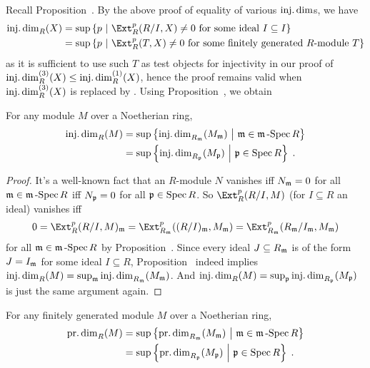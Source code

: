 \documentclass[a4paper,parskip=half,numbers=enddot, DIV=12]{scrreprt}
\begin{document}
Recall Proposition~. By the above proof of equality of various $\operatorname{inj.dim}$s, we have
\begin{align}\lbl{eq:idim}
	\begin{split}
		\idim_R(X)&=\sup\left\{p\st\Ext_R^p(R/I,X)\neq 0\text{ for some ideal }I\subseteq I\right\}\\
		&=\sup\left\{p\st\Ext_R^p(T,X)\neq 0\text{ for some finitely generated }R\text{-module }T\right\}
	\end{split}
\end{align}
as it is sufficient to use such $T$ as test objects for injectivity in our proof of $\operatorname{inj.dim}_R^{(3)}(X)\leq \operatorname{inj.dim}_R^{(1)}(X)$, hence the proof remains valid when $\operatorname{inj.dim}_R^{(3)}(X)$ is replaced by . Using Proposition~, we obtain
\begin{cor}
	For any module $M$ over a Noetherian ring,
	\begin{align*}
		\idim_R(M)&=\sup\left\{\idim_{R_\mm\vphantom{\pp}}(M_\mm)\st \mm\in\mSpec R\right\}\\
		&=\sup\left\{\idim_{R_\pp}(M_\pp)\st \pp\in\Spec R\right\}\;.
	\end{align*}
\end{cor}
\begin{proof}
	It's a well-known fact that an $R$-module $N$ vanishes iff $N_{\mathfrak{m}}=0$ for all $\mathfrak{m}\in\mathfrak{m}\operatorname{-Spec} R$ iff $N_{\mathfrak{p}}=0$ for all $\mathfrak{p}\in\operatorname{Spec} R$. So $\Ext_R^p(R/I,M)$ (for $I\subseteq R$ an ideal) vanishes iff
	\begin{align*}
		0=\Ext_R^p(R/I,M)_\mm=\Ext_{R_\mm}^p((R/I)_\mm,M_\mm)=\Ext_{R_\mm}^p(R_\mm/I_\mm,M_\mm)
	\end{align*}
	for all $\mathfrak{m}\in\mathfrak{m}\operatorname{-Spec} R$ by Proposition~. Since every ideal $J\subseteq R_{\mathfrak{m}}$ is of the form $J=I_{\mathfrak{m}}$ for some ideal $I\subseteq R$, Proposition~ indeed implies $\operatorname{inj.dim}_R(M)=\sup_{\mathfrak{m}}\operatorname{inj.dim}_{R_{\mathfrak{m}}}(M_{\mathfrak{m}})$. And $\operatorname{inj.dim}_R(M)=\sup_{\mathfrak{p}}\operatorname{inj.dim}_{R_{\mathfrak{p}}}(M_{\mathfrak{p}})$ is just the same argument again. 
\end{proof}
\begin{cor}
	For any finitely generated module $M$ over a Noetherian ring,
	\begin{align*}
	\pdim_R(M)&=\sup\left\{\pdim_{R_\mm\vphantom{\pp}}(M_\mm)\st \mm\in\mSpec R\right\}\\
	&=\sup\left\{\pdim_{R_\pp}(M_\pp)\st \pp\in\Spec R\right\}\;.
	\end{align*}
\end{cor}
\end{document}
